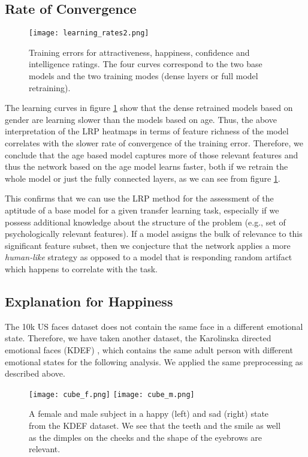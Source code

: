 \documentclass[runningheads]{llncs}
\begin{document}
\subsection{Rate of Convergence}

\begin{figure}[!htb]
\centering
\texttt{[image: learning\_rates2.png]}
\caption{
Training errors for attractiveness, happiness, confidence and intelligence ratings. The four curves correspond to the two base models and the two training modes (dense layers or full model retraining).
}
\label{fig:learning_curve}
\end{figure}

The learning curves in figure \ref{fig:learning_curve} show that the dense retrained models based on gender are learning slower than the models based on age. Thus, the above interpretation of the LRP heatmaps in terms of feature richness of the model correlates with the slower rate of convergence of the training error. Therefore, we conclude that the age based model captures more of those relevant features and thus the network based on the age model learns faster, both if we retrain the whole model or just the fully connected layers, as we can see from figure \ref{fig:learning_curve}.

This confirms that we can use the LRP method for the assessment of the aptitude of a base model for a given transfer learning task, especially if we possess additional knowledge about the structure of the problem (e.g., set of psychologically relevant features). If a model assigns the bulk of relevance to this significant feature subset, then we conjecture that the network applies a more {\it human-like} strategy as opposed to a model that is responding random artifact which happens to correlate with the task.

\subsection{Explanation for Happiness}
The 10k US faces dataset does not contain the same face in a different emotional state. Therefore, we have taken another dataset, the Karolinska directed emotional faces (KDEF) \cite{goeleven2008karolinska}, which contains the same adult person with different emotional states for the following analysis. We applied the same preprocessing as described above.
\begin{figure}[t]
\centering
\texttt{[image: cube\_f.png]}
\texttt{[image: cube\_m.png]}
\caption{
A female and male subject in a happy (left) and sad (right) state from the KDEF dataset. We see that the teeth and the smile as well as the dimples on the cheeks and the shape of the eyebrows are relevant.
}
\label{fig:cube_f}
\end{figure}
\end{document}
